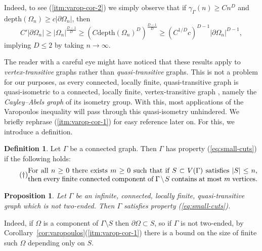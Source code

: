 \documentclass[11pt,a4paper]{amsart}
\newtheorem{proposition}[theorem]{Proposition}
\theoremstyle{definition}
\newtheorem{definition}[theorem]{Definition}
\begin{document}
Indeed, to see (\ref{itm:varop-cor-2}) we simply observe that if $\gamma_\Gamma(n) \geq C n^D$ and $\mathrm{depth}(\Omega_n) \geq c |\partial \Omega_n|$, then
\[
	C' |\partial \Omega_n| \geq |\Omega_n|^{\frac{D-1}{D}} \geq \left(C\mathrm{depth}(\Omega_n)^D \right)^{\frac{D-1}{D}}
	\geq (C^{1/D}c)^{D-1} |\partial \Omega_n|^{D-1},
\]
implying $D \leq 2$ by taking $n \to \infty$.

The reader with a careful eye might have noticed that these results apply to \emph{vertex-transitive} graphs rather than \emph{quasi-transitive} graphs. This is not a problem for our purposes, as every connected, locally finite, quasi-transitive graph is quasi-isometric to a connected, locally finite, vertex-transitive graph \cite[Prop.~5.1]{woess1994topological}, namely the \emph{Cayley--Abels graph} of its isometry group. With this, most applications of the Varopoulos inequality will pass through this quasi-isometry unhindered. 
We briefly rephrase (\ref{itm:varop-cor-1}) for easy reference later on. For this, we introduce a definition.

\begin{definition}
    Let $\Gamma$ be a connected graph. Then $\Gamma$ has property (\ref{eq:small-cuts}) if the following holds:
    \begin{equation}\tag{$\dagger$}\label{eq:small-cuts}
        \parbox{4.5in}{For all $n \geq 0$ there exists $m \geq 0$ such that if $S \subset V(\Gamma)$ satisfies $|S| \leq n$, then every finite connected component of $\Gamma \setminus S$ contains at most $m$ vertices.}
    \end{equation}
\end{definition}

\begin{proposition}\label{lem:finite-components-in-fg-groups}
    Let $\Gamma$ be an infinite, connected, locally finite, quasi-transitive graph which is not two-ended. Then $\Gamma$ satisfies property (\ref{eq:small-cuts}). 
\end{proposition}

 Indeed, if $\Omega$ is a component of $\Gamma \setminus S$ then $\partial \Omega \subset S$, so if $\Gamma$ is not two-ended, by Corollary~\ref{cor:varopoulos}(\ref{itm:varop-cor-1}) there is a bound on the size of finite such $\Omega$ depending only on $S$.

\end{document}
